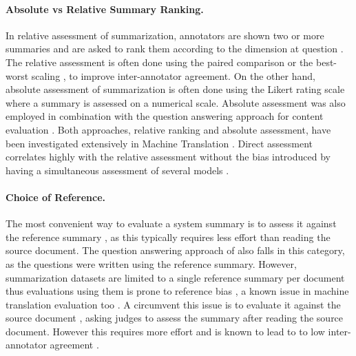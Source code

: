 \documentclass[11pt,a4paper]{article}
\begin{document}
\paragraph{Absolute vs Relative Summary Ranking.} 
In relative assessment of summarization, 
annotators are shown two or more summaries and are asked to rank them according to the dimension at question \citep{Yang2018a,Chen2018a,narayan-sidenet18,Guo2018a,Krishna2018a}. The relative assessment is often done using the paired comparison \citep{Thurstone1994} or the best-worst scaling \citep{Woodworth1991,louviere2015best}, to improve inter-annotator agreement. On the other hand,
absolute assessment of summarization \cite{Li2018b,Song2018a,Kryscinski2018,Hsu2018,hardy2018sum} 
is often done using the Likert rating scale \citep{Likert1932} where a summary is assessed on a numerical scale. 
Absolute assessment was also employed in combination with the question answering approach for content evaluation
\citep{narayan18xsum,Narayan2018}. Both approaches, relative ranking and absolute assessment, have been investigated extensively in Machine Translation \citep{Bojar2016, Bojar2017}. %
 Direct assessment correlates highly with the relative assessment without the bias introduced by having a simultaneous assessment of several models \citep{Bojar2011}. %

\paragraph{Choice of Reference.} 
The most convenient
way to evaluate a system summary is to assess it against the reference summary \citep{Celikyilmaz2018,Yang2018a,Peyrard2018a}, as this typically requires less effort than reading the source document. The question answering approach of \citet{narayan18xsum,Narayan2018} also falls in this category, as the questions were written using the reference summary. However, summarization datasets are limited to a single reference summary per document \citep{Sandhaus2008,Hermann2015,newsroom_N181065,narayan18xsum} thus evaluations using them
is prone to reference bias \citep{Louis2013}, a known issue in machine translation evaluation too \citep{fomicheva2016reference}. A circumvent this issue is to evaluate it against the source document \citep{Song2018a,narayan-sidenet18,Hsu2018,Kryscinski2018}, asking judges to assess the summary after reading the source document. However this requires more effort and is known to lead to 
to low inter-annotator agreement \citep{Nenkova2004}. 
\end{document}

